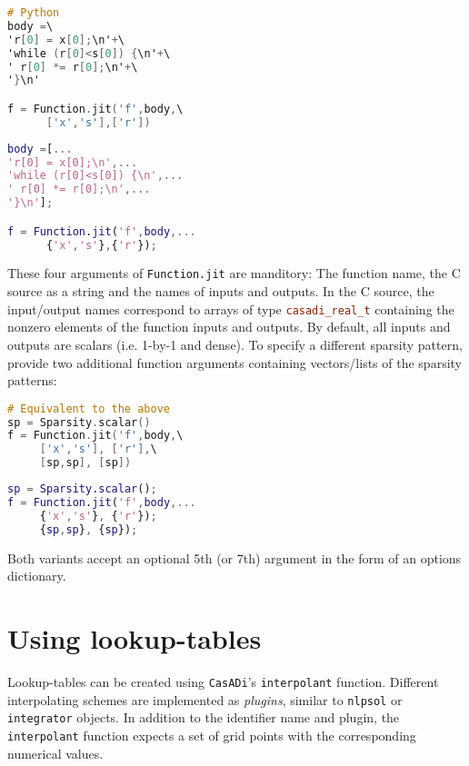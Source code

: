 \documentclass[a4paper,12pt]{book}
\newcommand{\n}{\\n}
\newcommand{\CasADi}{\texttt{CasADi}\xspace}
\newcommand{\python}[1]{\lstinline[language=Python]{#1}}
\newcommand{\cxx}[1]{\lstinline[language=C++]{#1}}
\begin{document}
\begin{minipage}[t]{0.5\textwidth}
\begin{lstlisting}[language=C]
# Python
body =\
'r[0] = x[0];\n'+\
'while (r[0]<s[0]) {\n'+\
' r[0] *= r[0];\n'+\
'}\n'

f = Function.jit('f',body,\
      ['x','s'],['r'])
\end{lstlisting}
\end{minipage}
\begin{minipage}[t]{0.5\textwidth}
\begin{lstlisting}[language=Matlab]
% MATLAB/Octave
body =[...
'r[0] = x[0];\n',...
'while (r[0]<s[0]) {\n',...
' r[0] *= r[0];\n',...
'}\n'];

f = Function.jit('f',body,...
      {'x','s'},{'r'});
\end{lstlisting}
\end{minipage}

These four arguments of \python{Function.jit} are manditory:
The function name, the C source as a string and the names of inputs and outputs.
In the C source, the input/output names correspond to arrays of type \cxx{casadi_real_t}
containing the nonzero elements of the function inputs and outputs. By default,
all inputs and outputs are scalars (i.e. 1-by-1 and dense). To specify a different sparsity pattern, provide two additional function arguments containing vectors/lists
of the sparsity patterns:

\begin{minipage}[t]{0.5\textwidth}
\begin{lstlisting}[language=C]
# Equivalent to the above
sp = Sparsity.scalar()
f = Function.jit('f',body,\
     ['x','s'], ['r'],\
     [sp,sp], [sp])
\end{lstlisting}
\end{minipage}
\begin{minipage}[t]{0.5\textwidth}
\begin{lstlisting}[language=Matlab]
% Equivalent to the above
sp = Sparsity.scalar();
f = Function.jit('f',body,...
     {'x','s'}, {'r'});
     {sp,sp}, {sp});
\end{lstlisting}
\end{minipage}

Both variants accept an optional 5th (or 7th) argument in the form of an
options dictionary.

\section{Using lookup-tables} \label{sec:lookup}
Lookup-tables can be created using \CasADi's \texttt{interpolant} function. Different interpolating schemes are implemented as \emph{plugins}, similar to \texttt{nlpsol} or \texttt{integrator} objects. In addition to the identifier name and plugin, the \texttt{interpolant} function expects a set of grid points with the corresponding numerical values.
\end{document}
